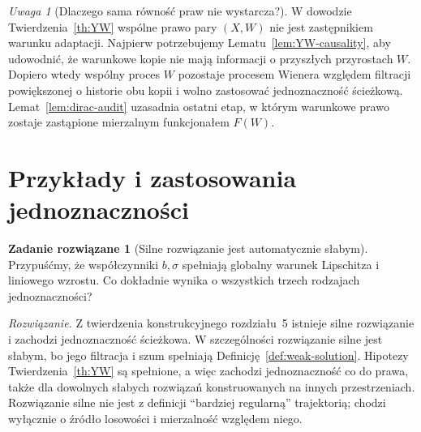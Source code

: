 \documentclass[11pt,a4paper,oneside]{report}
\numberwithin{equation}{chapter}
\theoremstyle{plain}
\theoremstyle{definition}
\newtheorem{zadanie}{Zadanie rozwiązane}[chapter]
\theoremstyle{remark}
\newtheorem{uwaga}{Uwaga}[chapter]
\begin{document}
\begin{uwaga}[Dlaczego sama równość praw nie wystarcza?]
W dowodzie Twierdzenia~\ref{th:YW} wspólne prawo pary
$(X,W)$ nie jest zastępnikiem warunku adaptacji.
Najpierw potrzebujemy Lematu~\ref{lem:YW-causality}, aby
udowodnić, że warunkowe kopie nie mają informacji o
przyszłych przyrostach $W$. Dopiero wtedy wspólny proces
$W$ pozostaje procesem Wienera względem filtracji
powiększonej o historie obu kopii i wolno zastosować
jednoznaczność ścieżkową. Lemat~\ref{lem:dirac-audit}
uzasadnia ostatni etap, w którym warunkowe prawo
zostaje zastąpione mierzalnym funkcjonałem $F(W)$.
\end{uwaga}

\section{Przykłady i zastosowania jednoznaczności}

\begin{zadanie}[Silne rozwiązanie jest automatycznie słabym]
Przypuśćmy, że współczynniki $b,\sigma$ spełniają
globalny warunek Lipschitza i liniowego wzrostu.
Co dokładnie wynika o wszystkich trzech rodzajach
jednoznaczności?

\emph{Rozwiązanie.} Z twierdzenia konstrukcyjnego
rozdziału~5 istnieje silne rozwiązanie i zachodzi
jednoznaczność ścieżkowa. W szczególności rozwiązanie
silne jest słabym, bo jego filtracja i szum spełniają
Definicję~\ref{def:weak-solution}. Hipotezy
Twierdzenia~\ref{th:YW} są spełnione, a więc zachodzi
jednoznaczność co do prawa, także dla dowolnych słabych
rozwiązań konstruowanych na innych przestrzeniach.
Rozwiązanie silne nie jest z definicji ``bardziej
regularną'' trajektorią; chodzi wyłącznie o źródło
losowości i mierzalność względem niego.
\end{zadanie}
\end{document}
